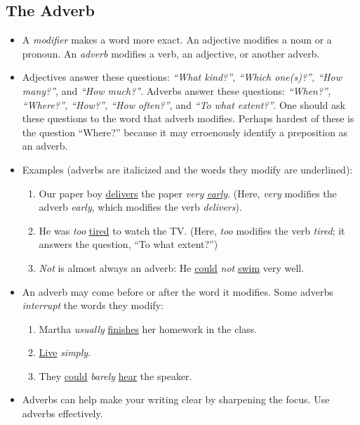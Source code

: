 \documentclass[12pt]{article}         %
\begin{document}
\subsection{The Adverb}
\label{sec: adverbs}
\begin{itemize}
\item 
    A \textit{modifier} makes a word more exact. An adjective modifies a noun or a pronoun. An \textit{adverb} modifies a verb, an adjective, or another adverb.
\item 
    Adjectives answer these questions: \textit{``What kind?'', ``Which one(s)?'', ``How many?''}, and \textit{``How much?''}. Adverbs answer these questions: \textit {``When?'', ``Where?'', ``How?'', ``How often?'',} and \textit{``To what extent?''}. One should ask these questions to the word that adverb modifies. Perhaps hardest of these is the question ``Where?'' because it may erroenously identify a preposition as an adverb.
\item
    Examples (adverbs are italicized and the words they modify are underlined):
        \begin{enumerate}
            \item Our paper boy \underline{delivers} the paper \textit{very} \textit{\underline{early}}. (Here, \textit{very} modifies the adverb \textit{early}, which modifies the verb \textit{delivers}).
            \item He was \textit{too} \underline{tired} to watch the TV. (Here, \textit{too} modifies the verb \textit{tired}; it answers the question, ``To what extent?'')
            \item \textit{Not} is almost always an adverb: He \underline{could} \textit{not} \underline{swim} very well.
        \end{enumerate}
    \item An adverb may come before or after the word it modifies. Some adverbs \textit{interrupt} the words they modify:
        \begin{enumerate}
            \item Martha \textit{usually} \underline{finishes} her homework in the class.
            \item \underline{Live} \textit{simply}.
            \item They \underline{could} \textit{barely} \underline{hear} the speaker.
        \end{enumerate}
    \item Adverbs can help make your writing clear by sharpening the focus. Use adverbs effectively.
\end{itemize}
\end{document}
